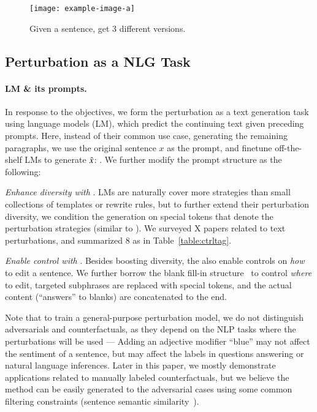 \begin{figure}[t]
\centering
\texttt{[image: example-image-a]}
\vspace{-15pt}
\caption{Given a sentence, get 3 different versions.}
\vspace{-10pt}
\label{fig:blank}
\end{figure}
\subsection{Perturbation as a NLG Task}

\paragraph{LM \& its prompts.}
In response to the objectives, we form the perturbation as a text generation task using language models (LM), which predict the continuing text given preceding prompts.
Here, instead of their common use case, \ie generating the remaining paragraphs, we use the original sentence $x$ as the prompt, and finetune off-the-shelf LMs to generate $\hat{x}$: \exinline{}.
We further modify the prompt structure as the following:

\emph{Enhance diversity with \tagstrs}.
LMs are naturally cover more strategies than small collections of templates or rewrite rules, but to further extend their perturbation diversity, we condition the generation on special tokens that denote the perturbation strategies (similar to \citet{raffel2019exploring, Dathathri2020Plug}).
We surveyed X papers related to text perturbations, and summarized 8 \tagstrs as in Table~\ref{table:ctrltag}.

\emph{Enable control with \BLANK}.
Besides boosting diversity, the \tagstrs also enable controls on \emph{how} to edit a sentence.
We further borrow the blank fill-in structure~\cite{donahue2020enabling} to control \emph{where} to edit, \ie targeted subphrases are replaced with special \BLANK tokens, and the actual content (``answers'' to blanks) are concatenated to the end. 

Note that to train a general-purpose perturbation model, we do not distinguish adversarials and counterfactuals, as they depend on the NLP tasks where the perturbations will be used --- Adding an adjective modifier ``blue'' may not affect the sentiment of a sentence, but may affect the labels in questions answering or natural language inferences.
Later in this paper, we mostly demonstrate applications related to manually labeled counterfactuals, but we believe the method can be easily generated to the adversarial cases using some common filtering constraints (\eg sentence semantic similarity~\cite{morris2020textattack}).


